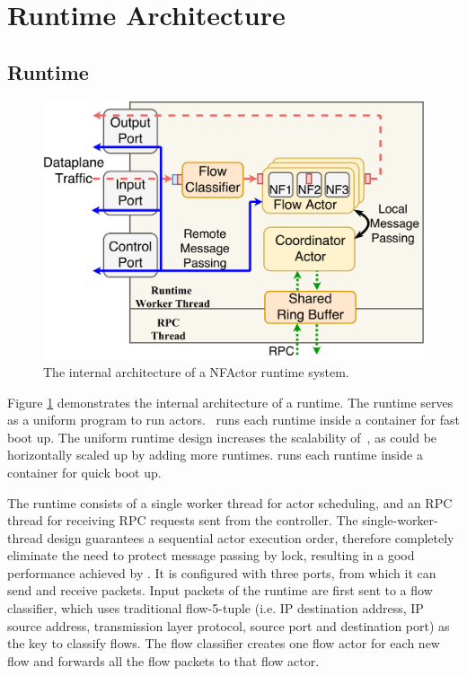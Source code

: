 \section{Runtime Architecture}

\subsection{Runtime}

\begin{figure}
		\centering
		\includegraphics[width=\columnwidth]{figure/new-nfactor-runtime-arch.pdf}

		\caption{The internal architecture of a NFActor runtime system. }
\label{fig:runtime-arch}
\end{figure}

Figure \ref{fig:runtime-arch} demonstrates the internal architecture of a runtime. The runtime serves as a uniform program to run actors. \nfactor~runs each runtime inside a container for fast boot up. The uniform runtime design increases the scalability of~\nfactor, as \nfactor could be horizontally scaled up by adding more runtimes. \nfactor runs each runtime inside a container for quick boot up.

The runtime consists of a single worker thread for actor scheduling, and an RPC thread for receiving RPC requests sent from the controller. The single-worker-thread design guarantees a sequential actor execution order, therefore completely eliminate the need to protect message passing by lock, resulting in a good performance achieved by \nfactor. It is configured with three ports, from which it can send and receive packets. Input packets of the runtime are first sent to a flow classifier, which uses traditional flow-5-tuple (i.e. IP destination address, IP source address, transmission layer protocol, source port and destination port) as the key to classify flows. The flow classifier creates one flow actor for each new flow and forwards all the flow packets to that flow actor.

